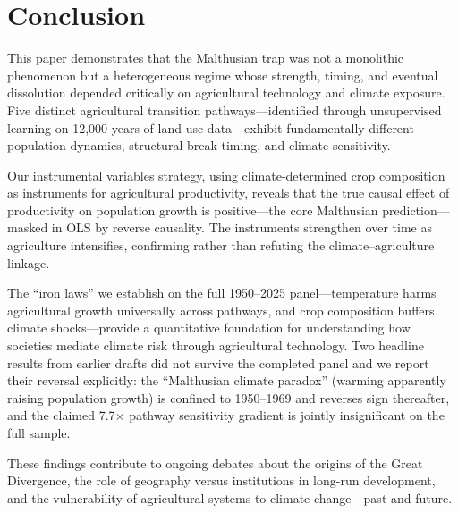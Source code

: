 \documentclass[12pt,letterpaper]{article}
\begin{document}
\section{Conclusion}

This paper demonstrates that the Malthusian trap was not a monolithic phenomenon but a heterogeneous regime whose strength, timing, and eventual dissolution depended critically on agricultural technology and climate exposure. Five distinct agricultural transition pathways---identified through unsupervised learning on 12,000 years of land-use data---exhibit fundamentally different population dynamics, structural break timing, and climate sensitivity.

Our instrumental variables strategy, using climate-determined crop composition as instruments for agricultural productivity, reveals that the true causal effect of productivity on population growth is positive---the core Malthusian prediction---masked in OLS by reverse causality. The instruments strengthen over time as agriculture intensifies, confirming rather than refuting the climate--agriculture linkage.

The ``iron laws'' we establish on the full 1950--2025 panel---temperature harms agricultural growth universally across pathways, and crop composition buffers climate shocks---provide a quantitative foundation for understanding how societies mediate climate risk through agricultural technology. Two headline results from earlier drafts did not survive the completed panel and we report their reversal explicitly: the ``Malthusian climate paradox'' (warming apparently raising population growth) is confined to 1950--1969 and reverses sign thereafter, and the claimed 7.7$\times$ pathway sensitivity gradient is jointly insignificant on the full sample.

These findings contribute to ongoing debates about the origins of the Great Divergence, the role of geography versus institutions in long-run development, and the vulnerability of agricultural systems to climate change---past and future.



\end{document}
